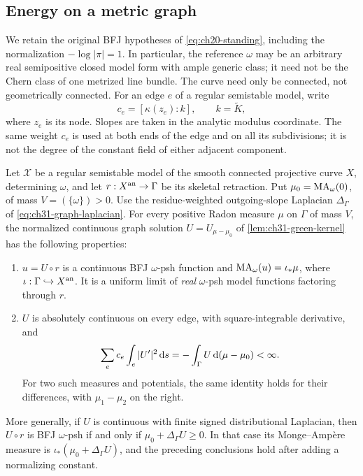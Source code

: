 \subsection{Energy on a metric graph}
\label{sec:ch26-ex-graph}

We retain the original BFJ hypotheses of \eqref{eq:ch20-standing},
including the normalization \(-\log|\pi|=1\).  In particular, the
reference \(\omega\) may be an arbitrary real semipositive closed model
form with ample generic class; it need not be the Chern class of one
metrized line bundle.  The curve need only be connected, not geometrically
connected.  For an edge \(e\) of a regular semistable model, write
\[
 c_e=[\kappa(z_e):k],\qquad k=\widetilde K,
\]
where \(z_e\) is its node.  Slopes are taken in the analytic modulus
coordinate.  The same weight \(c_e\) is used at both ends of the edge
and on all its subdivisions; it is not the degree of the constant field
of either adjacent component.

\begin{lemma}
\label{lem:ch26-weighted-graph-real-bfj}
Let \(\mathcal X\) be a regular semistable model of the smooth connected
projective curve \(X\), determining \(\omega\), and let
\(r:X^{\mathrm{an}}\to\Gamma\) be its skeletal retraction.  Put
\(\mu_0=\operatorname{MA}_\omega(0)\), of mass \(V=(\{\omega\})>0\).
Use the residue-weighted outgoing-slope Laplacian
\(\Delta_\Gamma\) of \eqref{eq:ch31-graph-laplacian}.
For every positive Radon measure \(\mu\) on \(\Gamma\) of mass \(V\),
the normalized continuous graph solution
\(U=U_{\mu-\mu_0}\) of \cref{lem:ch31-green-kernel} has the following
properties:
\begin{enumerate}
\item\label{itm:ch26-weighted:bfj}
 \(u=U\circ r\) is a continuous BFJ \(\omega\)-psh function and
 \(\operatorname{MA}_\omega(u)=\iota_*\mu\), where \(\iota:\Gamma\hookrightarrow X^{\mathrm{an}}\).
 It is a uniform limit of \emph{real} \(\omega\)-psh model functions
 factoring through \(r\).
\item\label{itm:ch26-weighted:energy}
 \(U\) is absolutely continuous on every edge, with square-integrable
 derivative, and
 \begin{equation}
 \label{eq:ch26-weighted-green-ibp}
 \sum_e c_e\int_e|U'|^2\,\mathrm d s
       =-\int_\Gamma U\,\mathrm d(\mu-\mu_0)<\infty.
 \end{equation}
 For two such measures and potentials, the same identity holds for
 their differences, with \(\mu_1-\mu_2\) on the right.
\end{enumerate}
More generally, if \(U\) is continuous with finite signed distributional
Laplacian, then \(U\circ r\) is BFJ \(\omega\)-psh if and only if
\(\mu_0+\Delta_\Gamma U\geq0\).  In that case its Monge--Amp\`ere
measure is \(\iota_*(\mu_0+\Delta_\Gamma U)\), and the preceding
conclusions hold after adding a normalizing constant.
\end{lemma}

